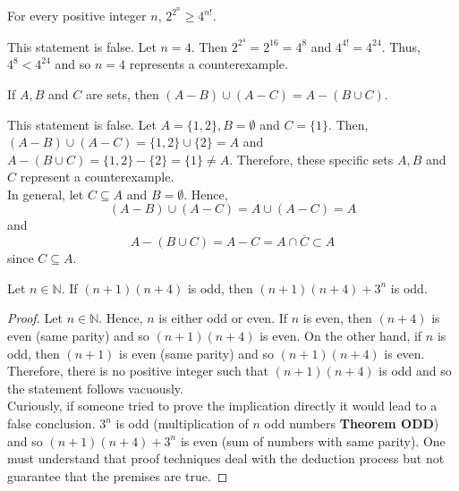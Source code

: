 \documentclass[12pt]{article}
\newcommand{\N}{\mathbb{N}}
\newenvironment{problem}[2][Problem]{\begin{trivlist}
		\item[\hskip \labelsep {\bfseries #1}\hskip \labelsep {\bfseries #2.}]}{\end{trivlist}}
\newenvironment{solution}[2][Solution]{\begin{trivlist}
		\item[\hskip \labelsep {\bfseries #1}\hskip \labelsep {\bfseries #2.}]}{\end{trivlist}}
\begin{document}
	\begin{problem}{5}
		For every positive integer $n$, $2^{2^{n}} \geq 4^{n!}$.
	\begin{solution}{5}
		This statement is false. Let $n=4$. Then $2^{2^{4}} = 2^{16}=4^{8}$ and $4^{4!} = 4^{24}$. Thus, $4^{8}<4^{24}$ and so $n=4$ represents a counterexample.
	\end{solution}
	\end{problem}

	\begin{problem}{6}
		If $A,B$ and $C$ are sets, then $(A-B)\cup (A-C)=A-(B\cup C)$.
		\begin{solution}{6}
			This statement is false. Let $A=\{1,2\}, B=\emptyset$ and $C=\{1\}$. Then, $(A-B)\cup (A-C) = \{1,2\}\cup \{2\} = A$ and $A-(B\cup C) = \{1,2\}-\{2\} = \{1\} \neq A$. Therefore, these specific sets $A,B$ and $C$ represent a counterexample.\\
			
			In general, let $C\subseteq A$ and $B=\emptyset$. Hence, 
			\begin{equation*}
				(A-B)\cup (A-C) = A\cup (A-C) = A
			\end{equation*}
			and 
			\begin{equation*}
				A-(B\cup C) = A-C = A\cap \overline{C} \subset A
			\end{equation*}
			since $C\subseteq A$. 
		\end{solution}
	\end{problem} 

	\begin{problem}{7}
		Let $n\in \N$. If $(n+1)(n+4)$ is odd, then $(n+1)(n+4)+3^{n}$ is odd.
		\begin{proof}
			Let $n\in \N$. Hence, $n$ is either odd or even. If $n$ is even, then $(n+4)$ is even (same parity) and so $(n+1)(n+4)$ is even. On the other hand, if $n$ is odd, then $(n+1)$ is even (same parity) and so $(n+1)(n+4)$ is even. Therefore, there is no positive integer such that $(n+1)(n+4)$ is odd and so the statement follows vacuously.\\
			
			Curiously, if someone tried to prove the implication directly it would lead to a false conclusion. $3^{n}$ is odd (multiplication of $n$ odd numbers \textbf{Theorem ODD}) and so $(n+1)(n+4)+3^{n}$ is even (sum of numbers with same parity). One must understand that proof techniques deal with the deduction process but not guarantee that the premises are true.
		\end{proof}
	\end{problem}
\end{document}
